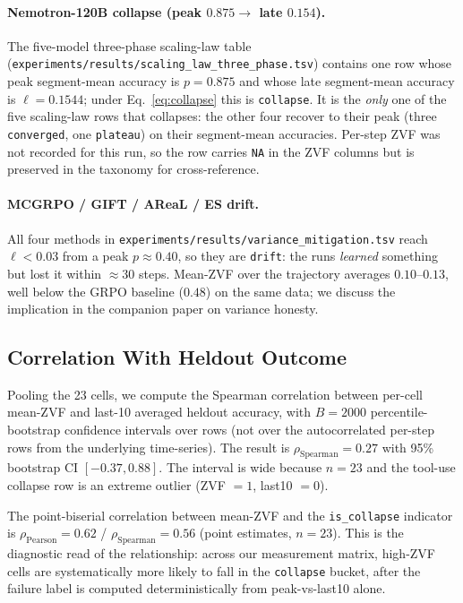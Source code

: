 \documentclass{article}
\begin{document}
\paragraph{Nemotron-120B collapse (peak $0.875 \to$ late $0.154$).}
The five-model three-phase scaling-law table
(\texttt{experiments/results/scaling\_law\_three\_phase.tsv})
contains one row whose peak segment-mean accuracy is $p = 0.875$ and
whose late segment-mean accuracy is $\ell = 0.1544$; under
Eq.~\ref{eq:collapse} this is \texttt{collapse}. It is the \emph{only}
one of the five scaling-law rows that collapses: the other four recover
to their peak (three \texttt{converged}, one \texttt{plateau}) on their
segment-mean accuracies. Per-step ZVF was not recorded for this run, so
the row carries \texttt{NA} in the ZVF columns but is preserved in the
taxonomy for cross-reference.

\paragraph{MCGRPO / GIFT / AReaL / ES drift.}
All four methods in \texttt{experiments/results/variance\_mitigation.tsv}
reach $\ell < 0.03$ from a peak $p \approx 0.40$, so they are
\texttt{drift}: the runs \emph{learned} something but lost it within
$\approx 30$ steps. Mean-ZVF over the trajectory averages
$0.10$–$0.13$, well below the GRPO baseline ($0.48$) on the same
data; we discuss the implication in
the companion paper on variance honesty.

\subsection{Correlation With Heldout Outcome}
\label{sec:zvf-cross-experiment:corr}

Pooling the 23 cells, we compute the Spearman correlation between
per-cell mean-ZVF and last-10 averaged heldout accuracy, with
$B=2000$ percentile-bootstrap confidence intervals over rows (not
over the autocorrelated per-step rows from the underlying
time-series). The result is
$\rho_{\mathrm{Spearman}} = 0.27$ with 95\% bootstrap CI
$[-0.37, 0.88]$. The interval is wide because $n=23$ and the
tool-use collapse row is an extreme outlier (ZVF $= 1$, last10 $= 0$).

The point-biserial correlation between mean-ZVF and the
\texttt{is\_collapse} indicator is
$\rho_{\mathrm{Pearson}} = 0.62$ / $\rho_{\mathrm{Spearman}}
= 0.56$ (point estimates, $n=23$). This is the diagnostic
read of the relationship: across our measurement matrix,
high-ZVF cells are systematically more likely to fall in the
\texttt{collapse} bucket, after the failure label is computed
deterministically from peak-vs-last10 alone.
\end{document}
